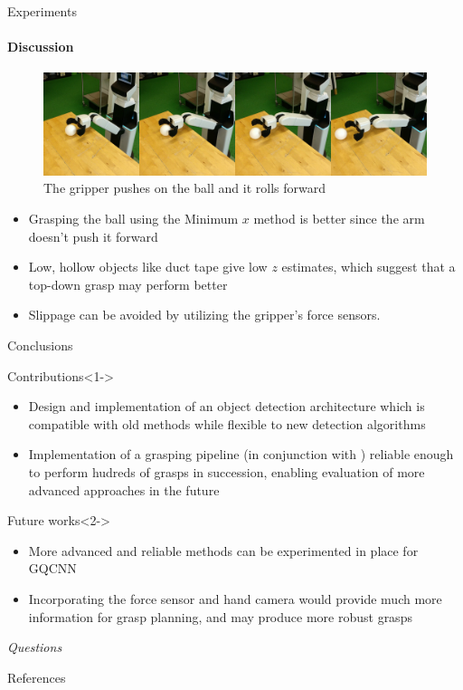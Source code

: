 \documentclass{beamer}
\begin{document}
\begin{frame}{Experiments}
\framesubtitle{Discussion}%
    \begin{figure}[t]
    \centering
    \includegraphics[width=0.8\linewidth]{grasp_ball_fail}
    \caption{\small The gripper pushes on the ball and it rolls forward}
    \label{fig:grasp_ball_fail}
    \end{figure}
    \begin{itemize}
        \small
        \item Grasping the ball using the Minimum $ x $ method is better since the arm doesn't push it forward
        \item Low, hollow objects like duct tape give low $ z $ estimates, which suggest that a top-down grasp may
        perform better
        \item Slippage can be avoided by utilizing the gripper's force sensors.
    \end{itemize}
\end{frame}

\begin{frame}{Conclusions}
\scriptsize
\begin{exampleblock}{Contributions}<1->
    \begin{itemize}
        \item Design and implementation of an object detection architecture which is compatible with old methods while
        flexible to new detection algorithms
        \item Implementation of a grasping pipeline (in conjunction with \cite{Padalkar2018}) reliable enough to
            perform hudreds of grasps in succession, enabling evaluation of more advanced approaches in the future
    \end{itemize}
\end{exampleblock}
\begin{exampleblock}{Future works}<2->
    \begin{itemize}
        \item More advanced and reliable methods can be experimented in place for GQCNN
        \item Incorporating the force sensor and hand camera would provide much more information for grasp planning,
            and may produce more robust grasps
    \end{itemize}
\end{exampleblock}
\normalsize
\end{frame}

\begin{frame}{}
\begin{center}
    \Huge \emph{Questions}
\end{center}
\end{frame}

\begin{frame}[allowframebreaks]{References}
    \printbibliography
\end{frame}
\end{document}
